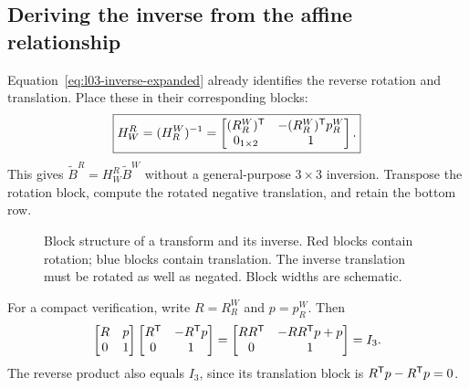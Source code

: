 \subsection{Deriving the inverse from the affine relationship}
Equation~\eqref{eq:l03-inverse-expanded} already identifies the reverse
rotation and translation. Place these in their corresponding blocks:
\begin{equation}
 \boxed{H_W^R=(H_R^W)^{-1}
 =\begin{bmatrix}
 (R_R^W)^{\mathsf T}&-(R_R^W)^{\mathsf T} p_R^W\\0_{1\times2}&1
 \end{bmatrix}.}
 \label{eq:l03-H-inverse}
\end{equation}
This gives $\widetilde B^R=H_W^R\widetilde B^W$ without a general-purpose
$3\times3$ inversion. Transpose the rotation block, compute the rotated
negative translation, and retain the bottom row.

\begin{figure}[htbp]
\centering
\caption{Block structure of a transform and its inverse. Red blocks contain
rotation; blue blocks contain translation. The inverse translation must be
rotated as well as negated. Block widths are schematic.}
\label{fig:l03-blocks}
\end{figure}

For a compact verification, write $R=R_R^W$ and $p=p_R^W$. Then
\[
 \begin{bmatrix}R&p\\0&1\end{bmatrix}
 \begin{bmatrix}R^{\mathsf T}&-R^{\mathsf T} p\\0&1\end{bmatrix}
 =\begin{bmatrix}RR^{\mathsf T}&-RR^{\mathsf T} p+p\\0&1\end{bmatrix}=I_3.
\]
The reverse product also equals $I_3$, since its translation block is
$R^{\mathsf T} p-R^{\mathsf T} p=0$.

